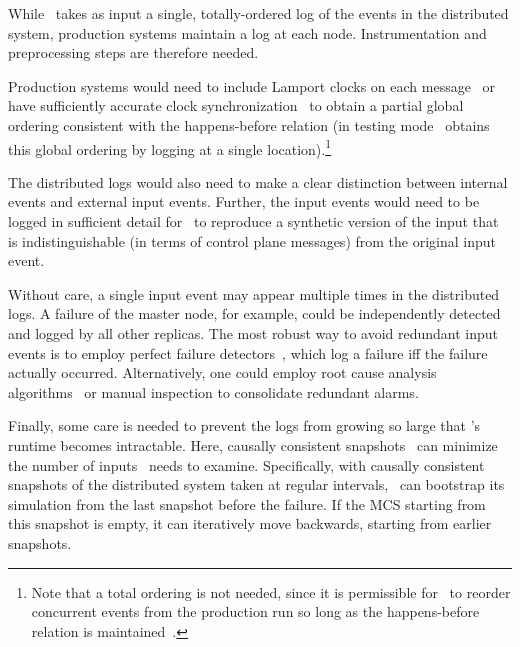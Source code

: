 While \simulator~takes as input a single, totally-ordered log of the events in the
distributed system, production systems maintain a log at each node.
Instrumentation and preprocessing steps are therefore needed.

Production systems would need to include Lamport
clocks on each message~\cite{Lamport:1978:TCO:359545.359563} or have
sufficiently accurate clock
synchronization~\cite{corbett2012spanner} to obtain a partial global ordering
consistent with the happens-before relation (in testing mode
\projectname~obtains this global ordering by logging at a single location).\footnote{
Note that a total ordering is not needed, since it is permissible
for \simulator~to reorder concurrent events from
the production run so long as the happens-before relation is
maintained~\cite{Fischer:1985:IDC:3149.214121}.}

The distributed logs would also need to make a clear distinction between
internal events and external input events. Further,
the input events would need to be logged in sufficient detail for \projectname~to
reproduce a synthetic version of the input that is indistinguishable (in terms
of control plane messages) from the original input event.

Without care, a single input event may appear multiple times in the
distributed logs. A failure of the master node, for example, could be independently
detected and logged by all other replicas. The most robust way to
avoid redundant input events is to employ perfect failure
detectors~\cite{chandra1996unreliable}, which log a failure iff
the failure actually occurred. %
Alternatively, one
could employ root cause analysis
algorithms~\cite{yemini1996} or manual inspection to consolidate redundant
alarms.

Finally, some care is needed to prevent the logs from growing so large that
\simulator's runtime becomes intractable. Here, causally consistent
snapshots~\cite{Chandy:1985:DSD:214451.214456} can minimize the number of inputs \simulator~needs
to examine. Specifically, with causally consistent snapshots of the distributed
system taken at regular intervals, \projectname~can bootstrap its simulation from the last snapshot before the failure.
If the MCS starting from this snapshot is empty, it can iteratively move backwards, starting from earlier
snapshots.


